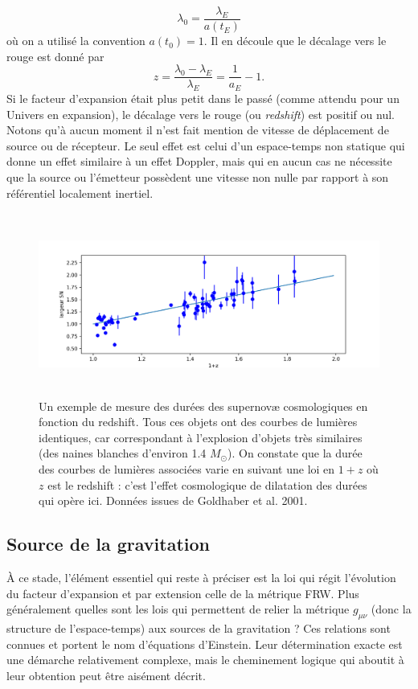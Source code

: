 \begin{equation}
\lambda_0=\frac{\lambda_E}{a(t_E)}
\end{equation}
où on a utilisé la convention $a(t_0)=1$. Il en découle que le décalage vers le rouge est donné par
\begin{equation}
z = \frac{\lambda_0-\lambda_E}{\lambda_E}=\frac{1}{a_E}-1.
\end{equation}
Si le facteur d'expansion était plus petit dans le passé (comme attendu pour un Univers en expansion), le décalage vers le rouge (ou \textit{redshift}) est positif ou nul. Notons qu'à aucun moment il n'est fait mention de vitesse de déplacement de source ou de récepteur. Le seul effet est celui d'un espace-temps non statique qui donne un effet similaire à un effet Doppler, mais qui en aucun cas ne nécessite que la source ou l'émetteur possèdent une vitesse non nulle par rapport à son référentiel localement inertiel.

\begin{figure}[htbp]
	\centering
		\includegraphics[height=6cm]{figs/wSN.png}
	\caption[Durée des supernovæ en fonction du redshift]{Un exemple de mesure des durées des supernovæ cosmologiques en fonction du redshift. Tous ces objets ont des courbes de lumières identiques, car correspondant à l'explosion d'objets très similaires (des naines blanches d'environ 1.4 $M_\odot$). On constate que la durée des courbes de lumières associées varie en suivant une loi en $1+z$ où $z$ est le redshift : c'est l'effet cosmologique de dilatation des durées qui opère ici. Données issues de Goldhaber et al. 2001.}
	\label{f:wSN}
\end{figure}

\subsection{Source de la gravitation}
À ce stade, l'élément essentiel qui reste à préciser est la loi qui régit l'évolution du facteur d'expansion et par extension celle de la métrique FRW. Plus généralement quelles sont les lois qui permettent de relier la métrique $g_{\mu\nu}$ (donc la structure de l'espace-temps) aux sources de la gravitation ? Ces relations sont connues et portent le nom d'équations d'Einstein. Leur détermination exacte est une démarche relativement complexe, mais le cheminement logique qui aboutit à leur obtention peut être aisément décrit. 

